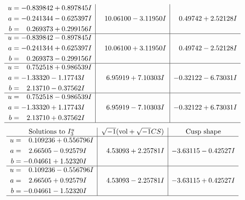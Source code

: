 \documentclass[1p]{elsarticle_modified}
\theoremstyle{definition}
\newcommand{\I}{\sqrt{-1}}
\begin{document}
$$\begin{array}{c|c|c}
\begin{aligned}
u &= -0.839842 + 0.897845 I \\
a &= -0.241344 - 0.625397 I \\
b &= \phantom{-}0.269373 + 0.299156 I\end{aligned}
 & \phantom{-}10.06100 - 3.11950 I & \phantom{-}0.49742 + 2.52128 I \\ \hline\begin{aligned}
u &= -0.839842 - 0.897845 I \\
a &= -0.241344 + 0.625397 I \\
b &= \phantom{-}0.269373 - 0.299156 I\end{aligned}
 & \phantom{-}10.06100 + 3.11950 I & \phantom{-}0.49742 - 2.52128 I \\ \hline\begin{aligned}
u &= \phantom{-}0.752518 + 0.986539 I \\
a &= -1.33320 - 1.17743 I \\
b &= \phantom{-}2.13710 - 0.37562 I\end{aligned}
 & \phantom{-}6.95919 + 7.10303 I & -0.32122 - 6.73031 I \\ \hline\begin{aligned}
u &= \phantom{-}0.752518 - 0.986539 I \\
a &= -1.33320 + 1.17743 I \\
b &= \phantom{-}2.13710 + 0.37562 I\end{aligned}
 & \phantom{-}6.95919 - 7.10303 I & -0.32122 + 6.73031 I\\
 \hline 
 \end{array}$$\newpage$$\begin{array}{c|c|c}  
\text{Solutions to }I^u_{3}& \I (\text{vol} + \sqrt{-1}CS) & \text{Cusp shape}\\
 \hline 
\begin{aligned}
u &= \phantom{-}0.109236 + 0.556796 I \\
a &= \phantom{-}2.66505 - 0.92579 I \\
b &= -0.04661 + 1.52320 I\end{aligned}
 & \phantom{-}4.53093 + 2.25781 I & -3.63115 - 0.42527 I \\ \hline\begin{aligned}
u &= \phantom{-}0.109236 - 0.556796 I \\
a &= \phantom{-}2.66505 + 0.92579 I \\
b &= -0.04661 - 1.52320 I\end{aligned}
 & \phantom{-}4.53093 - 2.25781 I & -3.63115 + 0.42527 I\\
 \hline 
 \end{array}$$\newpage
\end{document}
